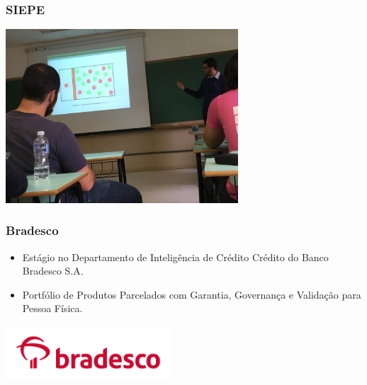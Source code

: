 \documentclass[10pt,
  aspectratio=169,
  serif,
  mathserif,
  professionalfont,
  compress,
  handout,
  ]{beamer}\usepackage[]{graphicx}\usepackage[]{color}
\begin{document}
\begin{frame}

\frametitle{SIEPE}

\begin{center}
  \includegraphics[height=6.5cm]{img/siepe1.jpg}
\end{center}

\end{frame}


\begin{frame}

\frametitle{Bradesco}

\begin{itemize}
  
  \itemsep 2ex
  
  \item Estágio no Departamento de Inteligência de Crédito Crédito do Banco Bradesco S.A.
  
  \item Portfólio de Produtos Parcelados com Garantia, Governança e Validação para Pessoa Física.
  
\end{itemize}

\begin{center}
  \includegraphics[height=2cm]{img/bra.png}
\end{center}

\end{frame}

\end{document}
